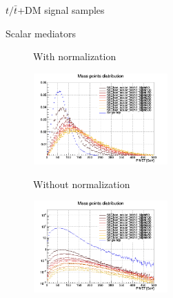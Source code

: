 \documentclass[8pt]{beamer}
\begin{document}
\begin{frame}{$t/\bar t$+DM signal samples}
\justifying
\begin{block}{\centering Scalar mediators}\end{block} \vspace{-10pt}
\begin{figure}[htbp]
\centering
\begin{minipage}[b]{.49\textwidth}
\vspace{-5pt}
\begin{block}{\centering With normalization}\end{block}
\begin{center}
\includegraphics[width=5.2cm, height=3.5cm]{figs/singleTopScalarMETNorm.png}
\end{center}
\end{minipage}
\begin{minipage}[b]{.02\textwidth}\end{minipage}
\begin{minipage}[b]{.49\textwidth}
\vspace{-5pt}
\begin{block}{\centering Without normalization}\end{block}
\begin{center}
\includegraphics[width=5.2cm, height=3.5cm]{figs/singleTopScalarMET.png}
\end{center}
\end{minipage}
\end{figure} \vfill


\end{frame}
\end{document}
